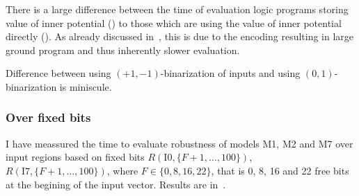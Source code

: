 There is a large difference between the time of evaluation logic programs storing
value of inner potential () to those which are using the value of
inner potential directly (). As already discussed
in~, this is due to the encoding resulting in large
ground program and thus inherently slower evaluation.

Difference between  using $(+1,-1)$-binarization of inputs
and  using $(0,1)$-binarization is miniscule.

\subsubsection{Over fixed bits}

I have meassured the time to evaluate robustness of models M1, M2 and M7
over input regions based on fixed bits $R(\text{I0}, \{F+1,\ldots,100\})$, $R(\text{I7}, \{F+1,\ldots,100\})$,
where $F\in\{0, 8, 16, 22\}$,
that is 0, 8, 16 and 22 free bits at the begining of the input vector.
Results are in~.

